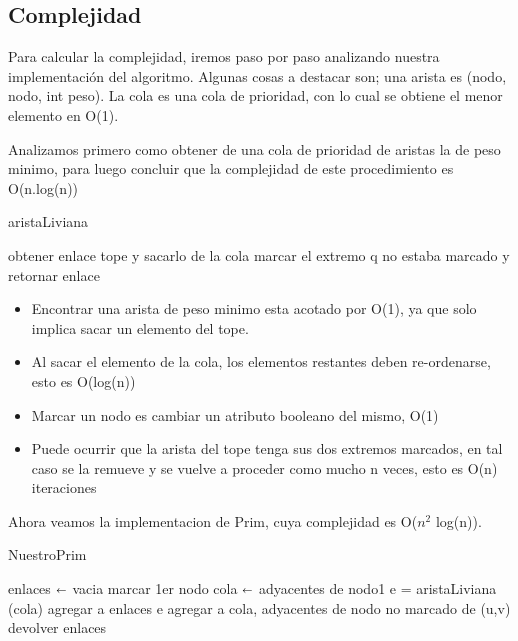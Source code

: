 \subsection{Complejidad}

Para calcular la complejidad, iremos paso por paso analizando nuestra implementación del algoritmo. Algunas cosas a destacar son; una arista es (nodo, nodo, int peso). La cola es una cola de prioridad, con lo cual se obtiene el menor elemento en O(1).


Analizamos primero como obtener de una cola de prioridad de aristas la de peso minimo, para luego concluir que la complejidad de este procedimiento es O(n.log(n))

\begin{algorithm}[H]
\caption{aristaLiviana}\label{ej2}
\begin{algorithmic}[1]
		\State obtener enlace tope y sacarlo de la cola 
			\State marcar el extremo q no estaba marcado y retornar enlace
		\EndIf
	\EndWhile
\EndProcedure
\end{algorithmic}
\end{algorithm}


\begin{itemize}
\item Encontrar una arista de peso minimo esta acotado por O(1), ya que solo implica sacar un elemento del tope.
\item Al sacar el elemento de la cola, los elementos restantes deben re-ordenarse, esto es O(log(n))
\item Marcar un nodo es cambiar un atributo booleano del mismo, O(1)
\item Puede ocurrir que la arista del tope tenga sus dos extremos marcados, en tal caso se la remueve y se vuelve a proceder como mucho n veces, esto es O(n) iteraciones
\end{itemize}  


Ahora veamos la implementacion de Prim, cuya complejidad es O($n^{2}$ log(n)).

\begin{algorithm}[H]
\caption{NuestroPrim}\label{ej2}
\begin{algorithmic}[1]
	\State enlaces $\shortleftarrow$ vacia 
	\State marcar 1er nodo
	\State cola $\shortleftarrow$ adyacentes de nodo1
		\State e = aristaLiviana (cola)
		\State agregar a enlaces e
		\State agregar a cola, adyacentes de nodo no marcado de (u,v)
	\EndWhile
	\State devolver enlaces
\EndProcedure
\end{algorithmic}
\end{algorithm}



